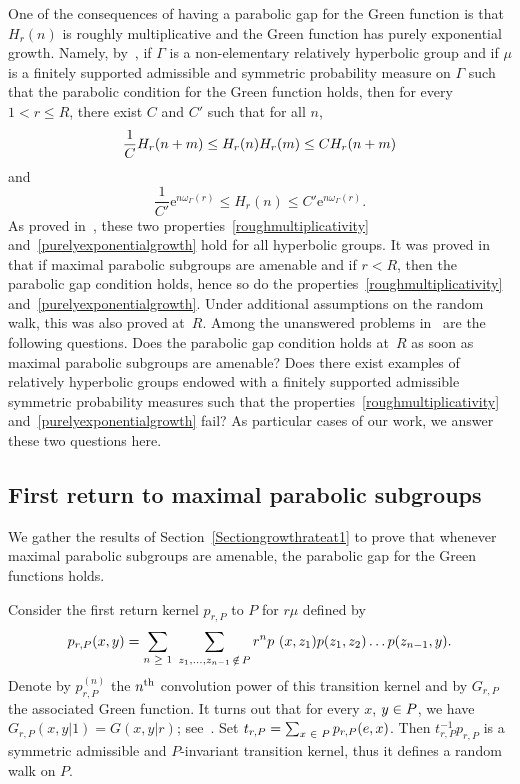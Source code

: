 \documentclass[10pt]{amsart}
\theoremstyle{definition}\newtheorem{defi}[theo]{Definition}\newtheorem{rema}[theo]{Remark}\newtheorem{exam}[theo]{Example}\newtheorem{exem}[theo]{Example}\newtheorem{nota}[theo]{Notation}
\newcommand{\rme}{\mathrm{e}}
\let\oldin\in
\renewcommand{\in}{\mathchoice{\oldin}{\oldin}{\,\oldin\,}{\,\oldin\,}}
\let\oldge\ge
\renewcommand{\ge}{\mathchoice{\oldge}{\oldge}{\,\oldge\,}{\,\oldge\,}}
\let\oldle\le
\renewcommand{\le}{\mathchoice{\oldle}{\oldle}{\,\oldle\,}{\,\oldle\,}}
\begin{document}
One of the consequences of having a parabolic gap for the Green function is that $H_r(n)$ is roughly multiplicative and the Green function has purely exponential growth. Namely, by~\cite[Theorem~1.8]{DWY}, if $\Gamma$ is a non-elementary relatively hyperbolic group and if $\mu$ is a finitely supported admissible and symmetric probability measure on $\Gamma$ such that the parabolic condition for the Green function holds, then for every $1<r\leq R$, there exist $C$ and $C'$ such that for all $n$,
\begin{equation}\label{roughmultiplicativity}
\frac{1}{C}H_{r} (n+m)\leq H_r(n)H_r(m)\le C H_{r} (n+m)
\end{equation}
and
\begin{equation}\label{purelyexponentialgrowth}
\frac{1}{C'}\rme^{n\omega_\Gamma(r)}\leq H_r(n)\leq C' \rme^{n\omega_\Gamma(r)}.
\end{equation}
As proved in~\cite{SWX}, these two properties~\eqref{roughmultiplicativity} and~\eqref{purelyexponentialgrowth} hold for all hyperbolic groups. It was proved in~\cite{DWY} that if maximal parabolic subgroups are amenable and if $r<R$, then the parabolic gap condition holds, hence so do the properties~\eqref{roughmultiplicativity} and~\eqref{purelyexponentialgrowth}. Under additional assumptions on the random walk, this was also proved at~$R$. Among the unanswered problems in~\cite{DWY} are the following questions. Does the parabolic gap condition holds at~$R$ as soon as maximal parabolic subgroups are amenable? Does there exist examples of relatively hyperbolic groups endowed with a finitely supported admissible symmetric probability measures such that the properties~\eqref{roughmultiplicativity} and~\eqref{purelyexponentialgrowth} fail? As particular cases of our work, we answer these two questions here.

\subsection{First return to maximal parabolic subgroups}

We gather the results of Section~\ref{Sectiongrowthrateat1} to prove that whenever maximal parabolic subgroups are amenable, the parabolic gap for the Green functions holds.


Consider the first return kernel $p_{r,P}$ to $P$ for $r \mu$ defined by
\[
p_{r,P}(x,y)=\sum_{n\ge 1}\;\sum_{z_1, \ldots,z_{n-1}\notin P} r^n p~(x,z_1)p(z_1,z_2) \dots p(z_{n-1},y).
\]
Denote by $p_{r, P}^{(n)}$ the $n^{\rm th}$ convolution power of this transition kernel and by $G_{r,P}$ the associated Green function. It turns out that for every $x$, $y\in P$, we have $G_{r,P}(x,y|1)=G(x,y|r)$; see~\cite[Lemma~4.4]{DG21}. Set $t_{r, P} = \sum_{x \in P} p_{r, P}(e, x)$. Then $t_{r, P}^{-1} p_{r, P}$ is a symmetric admissible and $P$-invariant transition kernel, thus it defines a random walk on $P$.
\end{document}
